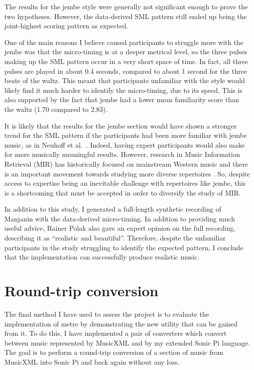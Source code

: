 \documentclass[12pt,twoside,openright]{report}
\begin{document}
The results for the jembe style were generally not significant enough to prove
the two hypotheses. However, the data-derived SML pattern still ended up being
the joint-highest scoring pattern as expected.

One of the main reasons I believe caused participants to struggle more with the
jembe was that the micro-timing is at a deeper metrical level, so the three
pulses making up the SML pattern occur in a very short space of time. In fact, all three pulses are
played in about 0.4 seconds, compared to about 1 second for the three beats of
the waltz. This meant that participants unfamiliar with the style would likely
find it much harder to identify the micro-timing, due to its speed. This is also
supported by the fact that jembe had a lower mean familiarity score than the
waltz (1.70 compared to 2.83).

It is likely that the results for the jembe section would have shown a stronger
trend for the SML pattern if the participants had been more familiar with jembe
music, as in Neuhoff et al.\ \cite{neuhoff2017}. Indeed, having expert participants would also make for more musically meaningful results. However, research in Music Information Retrieval (MIR) has historically focused on mainstream Western music \cite{gomez2013} and there is an important movement towards studying more diverse repertoires \cite{born2020}.
So, despite access to expertise being an inevitable challenge with repertoires like jembe, this is a shortcoming that must be accepted in order to diversify the study of MIR.

In addition to this study, I generated a full-length synthetic recording of
Manjanin with the data-derived micro-timing. In addition to providing much
useful advice, Rainer Polak also gave an expert opinion on the full recording,
describing it as ``realistic and beautiful''. Therefore, despite the unfamiliar
participants in the study struggling to identify the expected pattern, I conclude that the implementation can successfully produce realistic music.
\newpage



\section{Round-trip conversion} \label{metre_evaluation}

The final method I have used to assess the project is to evaluate the
implementation of metre by demonstrating the new utility that can be gained from
it. To do this, I have implemented a pair of converters which convert between
music represented by MusicXML and by my extended Sonic Pi language. The goal is
to perform a round-trip conversion of a section of music from MusicXML into Sonic Pi and back again without any loss.
\end{document}
